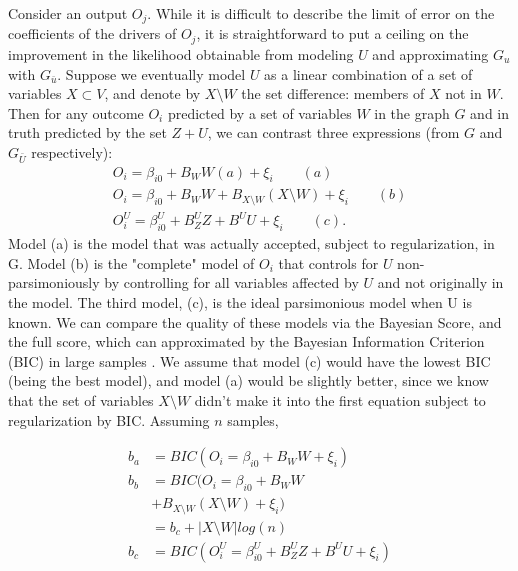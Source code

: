 \documentclass[letterpaper]{article}
\begin{document}
Consider an output $O_j$.  While it is difficult to describe the limit of error on the coefficients of the drivers of $O_j$, it is straightforward to put a ceiling on the improvement in the likelihood obtainable from modeling $U$ and approximating $G_u$ with $G_{\bar{u}}$.  Suppose we eventually model $U$ as a linear combination of a set of variables $X \subset V$, and denote by $X \setminus W$ the set difference: members of $X$ not in $W$.  Then for any outcome $O_i$ predicted by a set of variables $W$ in the graph $G$ and in truth predicted by the set $Z + U$, we can contrast three expressions (from $G$ and $G_{\bar{U}}$ respectively):
\begin{equation}
\begin{split}
O_i = \beta_{i0} + B_W W (a) + \xi_i \qquad (a)\\
O_i = \beta_{i0} + B_W W + B_{X \setminus W} (X \setminus W)
 + \xi_i \qquad (b)\\
O_i^U = \beta_{i0}^U + B_Z^U Z + B^U U + \xi_i \qquad (c).
\end{split}
\end{equation}
Model (a) is the model that was actually accepted, subject to regularization, in G.  Model (b) is the "complete" model of $O_i$ that controls for $U$ non-parsimoniously by controlling for all variables affected by $U$ and not originally in the model.  The third model, (c), is the ideal parsimonious model when U is known.  We can compare the quality of these models via the Bayesian Score, and the full score, which can approximated by the Bayesian Information Criterion (BIC) in large samples \cite{koller_probabilistic_2009}.  We assume that model (c) would have the lowest BIC (being the best model), and model (a) would be slightly better, since we know that the set of variables $X \setminus W$ didn't make it into the first equation subject to regularization by BIC.  Assuming $n$ samples,

\begin{align}
b_{a} &= BIC(O_{i} = \beta_{i0} + B_W W + \xi_i)  \\
b_{b} &= BIC(O_i = \beta_{i0} + B_W W  \\
               &  + B_{X \setminus W} (X \setminus W) + \xi_i) \nonumber \\
&  = b_c + |X\setminus W| log(n) \nonumber \\
b_{c} &= BIC(O_i^U = \beta_{i0}^U + B_Z^U Z + B^U U + \xi_i)
\end{align}
\end{document}
